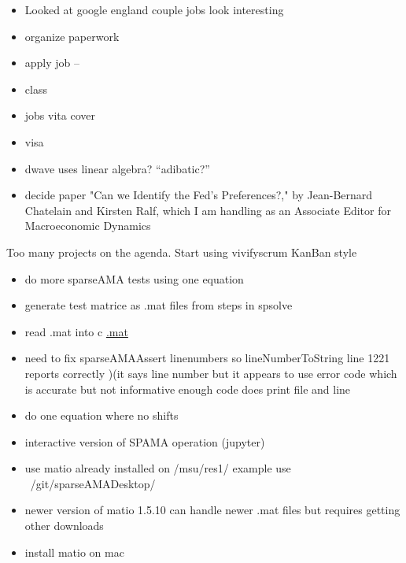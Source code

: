 \documentclass[hyperref]{labbook}
\begin{document}
\begin{itemize}
\item Looked at google england couple jobs look interesting
\item organize paperwork
\item apply job  -- 
\end{itemize}

\begin{itemize}
\item class
\item jobs vita  cover
\item visa
\item dwave uses linear algebra?  ``adibatic?''
\end{itemize}

\begin{itemize}
\item decide paper "Can we Identify the Fed's Preferences?," by Jean-Bernard Chatelain and Kirsten Ralf, which I am handling as an Associate Editor for Macroeconomic Dynamics 
\end{itemize}



Too many projects on the agenda. Start using vivifyscrum KanBan style

\begin{itemize}
\item do more sparseAMA tests using one equation
\item generate test matrice as .mat files from steps in spsolve
\item read .mat into c \href{http://www.mathworks.com/help/matlab/matlab_external/_f30937.html}{.mat}
\item need to fix sparseAMAAssert linenumbers so lineNumberToString line 1221 reports correctly  )(it says line number but it appears to use error code which is accurate but not informative enough code does print file and line
\item do one equation where no shifts
\item interactive version of SPAMA operation  (jupyter)
\item use matio already installed on /msu/res1/  example use ~/git/sparseAMADesktop/
\item newer version of matio 1.5.10 can handle newer .mat files but requires getting other downloads
\item install matio on mac
\end{itemize}
\end{document}

